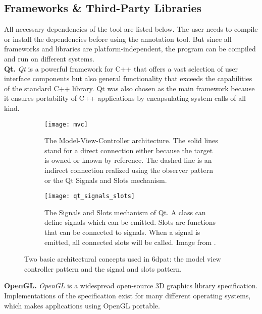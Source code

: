 \subsection{Frameworks \& Third-Party Libraries}

All necessary dependencies of the tool are listed below. The user needs to compile or install the dependencies before using the annotation tool. But since all frameworks and libraries are platform-independent, the program can be compiled and run on different systems. \\

\noindent\textbf{Qt.} \textit{Qt} \cite{qt} is a powerful framework for C++ that offers a vast selection of user interface components but also general functionality that exceeds the capabilities of the standard C++ library. Qt was also chosen as the main framework because it ensures portability of C++ applications by encapsulating system calls of all kind. \\

\begin{figure}[!tbp]
	\centering
	\begin{subfigure}[t]{0.47\textwidth}
		\centering
    	\texttt{[image: mvc]}
    	\caption{The Model-View-Controller architecture. The solid lines stand for a direct connection either because the target is owned or known by reference. The dashed line is an indirect connection realized using the observer pattern or the Qt Signals and Slots mechanism.}
    	\label{fig:mvc}
	\end{subfigure}
	\hfill
	\begin{subfigure}[t]{0.47\textwidth}
	\centering
    	\texttt{[image: qt\_signals\_slots]}
    	\caption{The Signals and Slots mechanism of Qt. A class can define signals which can be emitted. Slots are functions that can be connected to signals. When a signal is emitted, all connected slots will be called. Image from \cite{qt_signals_and_slots}.}
    	\label{fig:qt_signals_slots}
	\end{subfigure}
	\caption{Two basic architectural concepts used in \ac{6dpat}: the model view controller pattern and the signal and slots pattern.}
\end{figure} 

\noindent\textbf{OpenGL.} \textit{OpenGL} \cite{opengl} is a widespread open-source 3D graphics library specification. Implementations of the specification exist for many different operating systems, which makes applications using OpenGL portable. \\

